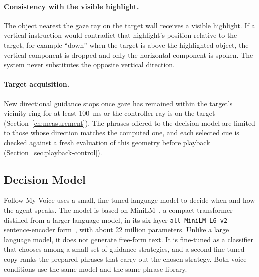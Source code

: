 \paragraph{Consistency with the visible highlight.} The object nearest the gaze ray on the target wall receives a visible highlight. If a vertical instruction would contradict that highlight's position relative to the target, for example ``down'' when the target is above the highlighted object, the vertical component is dropped and only the horizontal component is spoken. The system never substitutes the opposite vertical direction.

\paragraph{Target acquisition.} New directional guidance stops once gaze has remained within the target's vicinity ring for at least 100~ms or the controller ray is on the target (Section~\ref{ch:measurement}). The phrases offered to the decision model are limited to those whose direction matches the computed one, and each selected cue is checked against a fresh evaluation of this geometry before playback (Section~\ref{sec:playback-control}).

\subsection{Decision Model}
\label{sec:decision-model}
Follow My Voice uses a small, fine-tuned language model to decide when and how the agent speaks. The model is based on MiniLM~\cite{wang2020minilm}, a compact transformer distilled from a larger language model, in its six-layer \texttt{all-MiniLM-L6-v2} sentence-encoder form~\cite{reimers2019sbert}, with about 22 million parameters. Unlike a large language model, it does not generate free-form text. It is fine-tuned as a classifier that chooses among a small set of guidance strategies, and a second fine-tuned copy ranks the prepared phrases that carry out the chosen strategy. Both voice conditions use the same model and the same phrase library.

